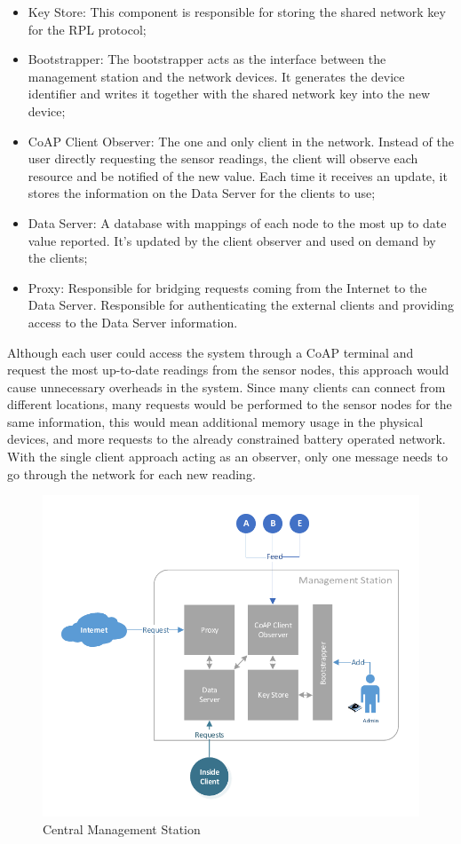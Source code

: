 \documentclass{sig-alternate-05-2015}
\begin{document}
\begin{itemize}
	\item Key Store: This component is responsible for storing the shared network key for the RPL protocol;
	\item Bootstrapper: The bootstrapper acts as the interface between the management station and the network devices. It generates the device identifier and writes it together with the shared network key into the new device;
	\item CoAP Client Observer:  The one and only client in the network. Instead of the user directly requesting the sensor readings, the client will observe each resource and be notified of the new value. Each time it receives an update, it stores the information on the Data Server for the clients to use;
	\item Data Server: A database with mappings of each node to the most up to date value reported. It's updated by the client observer and used on demand by the clients;
	\item Proxy: Responsible for bridging requests coming from the Internet to the Data Server. Responsible for authenticating the external clients and providing access to the Data Server information.
\end{itemize}

Although each user could access the system through a \gls{CoAP} terminal and request the most up-to-date readings from the sensor nodes, this approach would cause unnecessary overheads in the system. Since many clients can connect from different locations, many requests would be performed to the sensor nodes for the same information, this would mean additional memory usage in the physical devices, and more requests to the already constrained battery operated network. With the single client approach acting as an observer, only one message needs to go through the network for each new reading.

\begin{figure}[h]
  \centering
  \includegraphics[width=1.05\linewidth]{figures/White_Box_Model.pdf}
  \caption{Central Management Station}
  \label{fig:core_components}
\end{figure}
\end{document}
